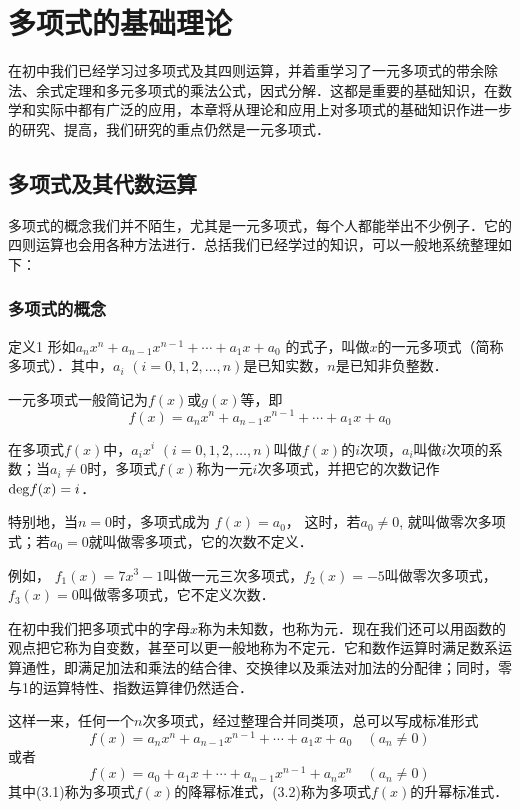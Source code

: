 \chapter{多项式的基础理论}
在初中我们已经学习过多项式及其四则运算，并着重学习了一元多项式的带余除法、余式定理和多元多项式的乘法公式，因式分解．这都是重要的基础知识，在数学和实际中都有广泛的应用，本章将从理论和应用上对多项式的基础知识作进一步的研究、提高，我们研究的重点仍然是一元多项式．

\section{多项式及其代数运算}
多项式的概念我们并不陌生，尤其是一元多项式，每个人都能举出不少例子．它的四则运算也会用各种方法进行．总括我们已经学过的知识，可以一般地系统整理如下：

\subsection{多项式的概念}
\begin{blk}{定义1}
    形如$a_nx^n+a_{n-1}x^{n-1}+\cdots+a_1x +a_0$
的式子，叫做$x$的一元多项式（简称多项式）．其中，$a_i$ $(i=0, 1, 2,\ldots,n)$是已知实数，$n$是已知非负整数．
\end{blk}
一元多项式一般简记为$f(x)$或$g(x)$等，即
$$f (x) =a_nx^n+a_{n-1}x^{n-1}+\cdots+a_1x +a_0$$

在多项式$f(x)$中，$a_ix^i$ $(i=0, 1, 2,\ldots,n)$叫做$f(x)$的$i$次项，$a_i$叫做$i$次项的系数；当$a_i\ne 0$时，多项式$f(x)$称为一元$i$次多项式，并把它的次数记作${\rm deg} f(x)=i$．

特别地，当$n=0$时，多项式成为
$f (x) =a_0$，
这时，若$a_0\ne 0$, 就叫做零次多项式；若$a_0=0$就叫做零多项式，它的次数不定义．

例如，
$f_1(x)=7x^3-1$叫做一元三次多项式，$f_2(x)=-5$叫做零次多项式，$f_3(x)=0$叫做零多项式，它不定义次数．

\begin{rmk}
    在初中我们把多项式中的字母$x$称为未知数，也称为元．现在我们还可以用函数的观点把它称为自变数，甚至可以更一般地称为不定元．它和数作运算时满足数系运算通性，即满足加法和乘法的结合律、交换律以及乘法对加法的分配律；同时，零与1的运算特性、指数运算律仍然适合．
\end{rmk}

这样一来，任何一个$n$次多项式，经过整理合并同类项，总可以写成标准形式
\begin{equation}
f(x)=a_nx^n+a_{n-1}x^{n-1}+\cdots+a_1x +a_0\quad (a_n\ne 0)
\end{equation}
或者
\begin{equation}
    f(x)=a_0+a_1x+\cdots+a_{n-1}x^{n-1}+a_nx^n\quad (a_n\ne 0)
\end{equation}
其中(3.1)称为多项式$f(x)$的降幂标准式，(3.2)称为多项式$f(x)$的升幂标准式．

